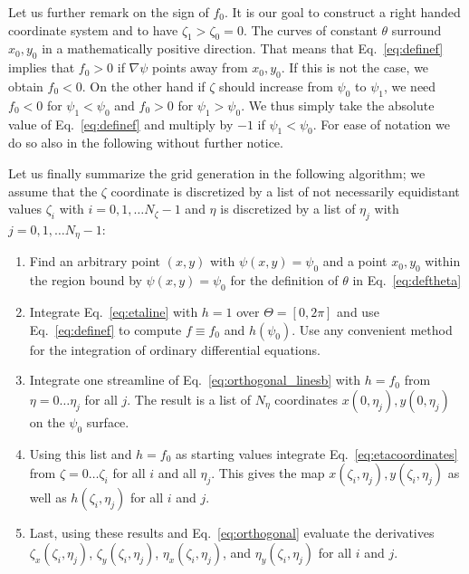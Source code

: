 \documentclass{hitec} %
\begin{document}
Let us further remark on the sign of $f_0$. It is our goal to construct a right handed
coordinate system and to have $\zeta_1>\zeta_0=0$.
The curves of constant $\theta$ surround $x_0, y_0$ in a mathematically positive direction. 
That means that Eq.~\eqref{eq:definef} implies that $f_0>0$ if $\nabla \psi$ points away from $x_0, y_0$. If this is not the case, we obtain $f_0 < 0$. 
On the other hand if $\zeta$ should increase from $\psi_0$ to $\psi_1$, we
need $f_0 <0$ for $\psi_1<\psi_0$ and $f_0>0$ for $\psi_1>\psi_0$. 
We thus simply take the absolute value of Eq.~\eqref{eq:definef} and multiply 
by $-1$ if $\psi_1<\psi_0$. 
For ease of notation we do so also in the following without further notice.

Let us finally summarize the grid generation in the following algorithm; we 
assume that the $\zeta$ coordinate is discretized by a list of 
not necessarily equidistant values $\zeta_i$ with $i = 0,1,\dots N_\zeta-1$ 
and $\eta$ is discretized by a list of $\eta_j$ with $j = 0,1,\dots N_\eta-1$:
\begin{enumerate}
  \item Find an arbitrary point $(x,y)$ with $\psi(x,y) = \psi_0$
    and a point $x_0, y_0$ within the region bound by $\psi(x,y) = \psi_0$ for the definition of $\theta$ in Eq.~\eqref{eq:deftheta}
  \item Integrate Eq.~\eqref{eq:etaline} with $h=1$ over $\Theta=[0,2\pi]$ and use Eq.~\eqref{eq:definef} to compute $f \equiv f_0$ and $h(\psi_0)$.
    Use any convenient method for the integration of ordinary differential equations.
  \item Integrate one streamline of Eq.~\eqref{eq:orthogonal_linesb} with $h=f_0$
    from $\eta = 0\dots\eta_j$ for all $j$.
    The result is a list of $N_\eta$ coordinates $x(0,\eta_j), y(0,\eta_j)$ on the $\psi_0$ surface.
  \item Using this list and $h=f_0$ as starting values integrate Eq.~\eqref{eq:etacoordinates}
    from $\zeta=0\dots\zeta_i$ for all $i$ and all $\eta_j$. This gives the map $x(\zeta_i, \eta_j), y(\zeta_i, \eta_j)$ as well as $h(\zeta_i,\eta_j)$ for all $i$ and $j$.
  \item Last, using these results and 
    Eq.~\eqref{eq:orthogonal} evaluate the derivatives 
    $\zeta_x(\zeta_i,\eta_j)$, $\zeta_y(\zeta_i, \eta_j)$, $\eta_x(\zeta_i,\eta_j)$, and $\eta_y(\zeta_i, \eta_j)$ for all $i$ and $j$.
\end{enumerate}

\end{document}
